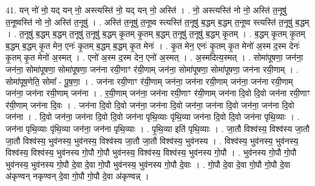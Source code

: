 \documentclass[17pt]{extarticle}
\begin{document}
41. यन् नो॑ नो॒ यद् यन् नो॒ अस्त्यस्ति॑ नो॒ यद् यन् नो॒ अस्ति॑ । . नो॒ अस्त्यस्ति॑ नो नो॒ अस्ति॑ त॒नूषु॑ त॒नूष्वस्ति॑ नो नो॒ अस्ति॑ त॒नूषु॑ । . अस्ति॑ त॒नूषु॑ त॒नूष्व स्त्यस्ति॑ त॒नूषु॑ ब॒द्धम् ब॒द्धम् त॒नूष्व स्त्यस्ति॑ त॒नूषु॑ ब॒द्धम् । . त॒नूषु॑ ब॒द्धम् ब॒द्धम् त॒नूषु॑ त॒नूषु॑ ब॒द्धम् कृ॒तम् कृ॒तम् ब॒द्धम् त॒नूषु॑ त॒नूषु॑ ब॒द्धम् कृ॒तम् । . ब॒द्धम् कृ॒तम् कृ॒तम् ब॒द्धम् ब॒द्धम् कृ॒त मेन॒ एनः॑ कृ॒तम् ब॒द्धम् ब॒द्धम् कृ॒त मेनः॑ । . कृ॒त मेन॒ एनः॑ कृ॒तम् कृ॒त मेनो॑ अ॒स्म द॒स्म देनः॑ कृ॒तम् कृ॒त मेनो॑ अ॒स्मत् । . एनो॑ अ॒स्म द॒स्म देन॒ एनो॑ अ॒स्मत् । . अ॒स्मदित्य॒स्मत् । . सोमा॑पूषणा॒ जन॑ना॒ जन॑ना॒ सोमा॑पूषणा॒ सोमा॑पूषणा॒ जन॑ना रयी॒णाꣳ र॑यी॒णाम् जन॑ना॒ सोमा॑पूषणा॒ सोमा॑पूषणा॒ जन॑ना रयी॒णाम् । . सोमा॑पूष॒णेति॒ सोमा᳚ - पू॒ष॒णा॒ । . जन॑ना रयी॒णाꣳ र॑यी॒णाम् जन॑ना॒ जन॑ना रयी॒णाम् जन॑ना॒ जन॑ना रयी॒णाम् जन॑ना॒ जन॑ना रयी॒णाम् जन॑ना । . र॒यी॒णाम् जन॑ना॒ जन॑ना रयी॒णाꣳ र॑यी॒णाम् जन॑ना दि॒वो दि॒वो जन॑ना रयी॒णाꣳ र॑यी॒णाम् जन॑ना दि॒वः । . जन॑ना दि॒वो दि॒वो जन॑ना॒ जन॑ना दि॒वो जन॑ना॒ जन॑ना दि॒वो जन॑ना॒ जन॑ना दि॒वो जन॑ना । . दि॒वो जन॑ना॒ जन॑ना दि॒वो दि॒वो जन॑ना पृथि॒व्याः पृ॑थि॒व्या जन॑ना दि॒वो दि॒वो जन॑ना पृथि॒व्याः । . जन॑ना पृथि॒व्याः पृ॑थि॒व्या जन॑ना॒ जन॑ना पृथि॒व्याः । . पृ॒थि॒व्या इति॑ पृथि॒व्याः । . जा॒तौ विश्व॑स्य॒ विश्व॑स्य जा॒तौ जा॒तौ विश्व॑स्य॒ भुव॑नस्य॒ भुव॑नस्य॒ विश्व॑स्य जा॒तौ जा॒तौ विश्व॑स्य॒ भुव॑नस्य । . विश्व॑स्य॒ भुव॑नस्य॒ भुव॑नस्य॒ विश्व॑स्य॒ विश्व॑स्य॒ भुव॑नस्य गो॒पौ गो॒पौ भुव॑नस्य॒ विश्व॑स्य॒ विश्व॑स्य॒ भुव॑नस्य गो॒पौ । . भुव॑नस्य गो॒पौ गो॒पौ भुव॑नस्य॒ भुव॑नस्य गो॒पौ दे॒वा दे॒वा गो॒पौ भुव॑नस्य॒ भुव॑नस्य गो॒पौ दे॒वाः । . गो॒पौ दे॒वा दे॒वा गो॒पौ गो॒पौ दे॒वा अ॑कृण्वन् नकृण्वन् दे॒वा गो॒पौ गो॒पौ दे॒वा अ॑कृण्वन्न् । \newline
\end{document}
